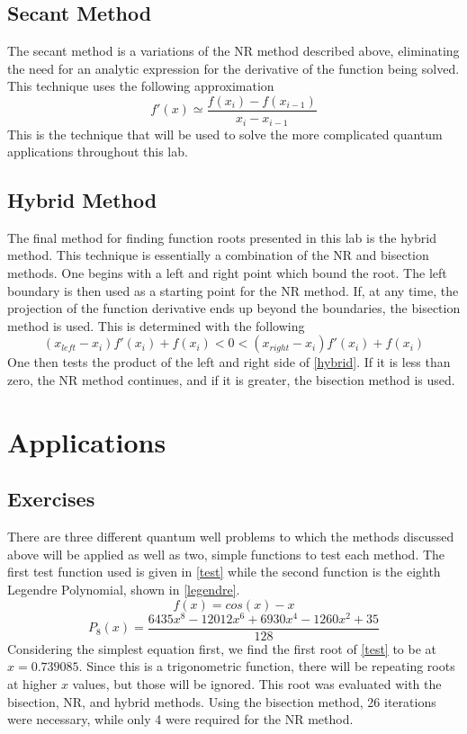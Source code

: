 \documentclass[12pt]{article}
\begin{document}
\subsection{Secant Method}
The secant method is a variations of the NR method described above, eliminating the need for an analytic expression for the derivative of the function being solved.  This technique uses the following approximation 
\begin{equation}
\label{derivApprox}
f'(x)\simeq\frac{f(x_i)-f(x_{i-1})}{x_i-x_{i-1}}
\end{equation}
This is the technique that will be used to solve the more complicated quantum applications throughout this lab.
\subsection{Hybrid Method}
The final method for finding function roots presented in this lab is the hybrid method.  This technique is essentially a combination of the NR and bisection methods.  One begins with a left and right point which bound the root.  The left boundary is then used as a starting point for the NR method.  If, at any time, the projection of the function derivative ends up beyond the boundaries, the bisection method is used.  This is determined with the following
\begin{equation}
\label{hybrid}
(x_{left}-x_i)f'(x_i)+f(x_i) < 0 < (x_{right}-x_i)f'(x_i)+f(x_i)
\end{equation}
One then tests the product of the left and right side of \eqref{hybrid}.  If it is less than zero, the NR method continues, and if it is greater, the bisection method is used. 

\section{Applications}
\subsection{Exercises}
There are three different quantum well problems to which the methods discussed above will be applied as well as  two, simple functions to test each method.  The first test function used is given in \eqref{test} while the second function is the eighth Legendre Polynomial, shown in \eqref{legendre}.
\begin{equation}
\label{test}
f(x) = cos(x) - x
\end{equation}
\begin{equation}
\label{legendre}
P_8(x)=\frac{6435x^8-12012x^6+6930x^4-1260x^2+35}{128}
\end{equation}
Considering the simplest equation first, we find the first root of \eqref{test} to be at $x=0.739085$.  Since this is a trigonometric function, there will be repeating roots at higher $x$ values, but those will be ignored.  This root was evaluated with the bisection, NR, and hybrid methods.  Using the bisection method, 26 iterations were necessary, while only 4 were required for the NR method.  
\end{document}
